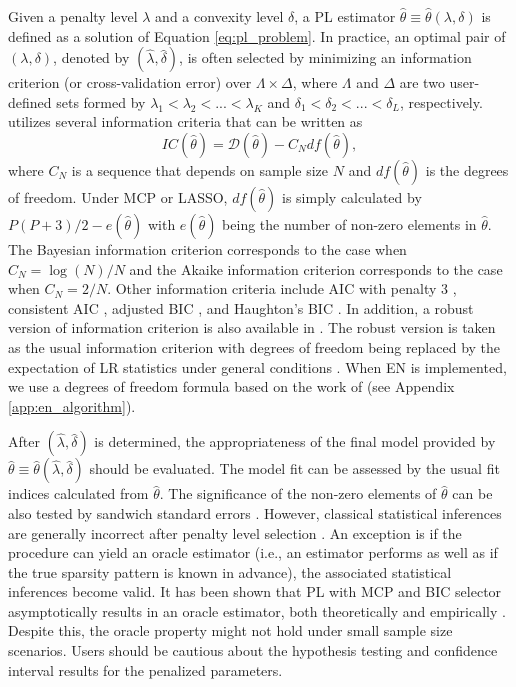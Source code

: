 \documentclass[nojss]{jss}
\begin{document}
Given a penalty level $\lambda$ and a convexity level $\delta$, a PL estimator $\hat{\theta} \equiv \hat{\theta}(\lambda, \delta)$ is defined as a solution of Equation \ref{eq:pl_problem}. In practice, an optimal pair of $(\lambda,\delta)$, denoted by $(\hat{\lambda},\hat{\delta})$, is often selected by minimizing an information criterion (or cross-validation error) over $\Lambda \times \Delta$, where $\Lambda$ and $\Delta$ are two user-defined sets formed by $\lambda_1 < \lambda_2 < ... < \lambda_K$ and $\delta_1 < \delta_2 <...<\delta_L$, respectively.  utilizes several information criteria that can be written as
%
\begin{equation} \label{eq:ic}
IC(\hat{\theta}) = \mathcal{D}(\hat{\theta}) - C_N df(\hat{\theta}),
\end{equation}
%
where $C_N$ is a sequence that depends on sample size $N$ and $df(\hat{\theta})$ is the degrees of freedom. Under MCP or LASSO, $df(\hat{\theta})$ is simply calculated by $P(P+3)/2-e(\hat{\theta})$ with $e(\hat{\theta})$ being the number of non-zero elements in $\hat{\theta}$. The Bayesian information criterion \citep[BIC;][]{Schwarz1978} corresponds to the case when $C_N=\log(N)/N$ and the Akaike information criterion \citep[AIC;][]{Akaike1974} corresponds to the case when $C_N=2/N$. Other information criteria include AIC with penalty 3 \citep[AIC3;][]{Sclove1987}, consistent AIC \citep[CAIC;][]{Bozdogan1987}, adjusted BIC \citep[ABIC;][]{Sclove1987}, and Haughton's BIC \citep[HBIC;][]{haughton1988}. In addition, a robust version of information criterion is also available in . The robust version is taken as the usual information criterion with degrees of freedom being replaced by the expectation of LR statistics under general conditions \citep[e.g.,][see Appendix \ref{app:technical} for technical details]{Yuan2007}. When EN is implemented, we use a degrees of freedom formula based on the work of \cite{tibshirani2012} (see Appendix \ref{app:en_algorithm}).

After $(\hat{\lambda},\hat{\delta})$ is determined, the appropriateness of the final model provided by $\hat{\theta} \equiv \hat{\theta}(\hat{\lambda},\hat{\delta})$ should be evaluated. The model fit can be assessed by the usual fit indices calculated from $\hat{\theta}$. The significance of the non-zero elements of $\hat{\theta}$ can be also tested by sandwich standard errors \citep[e.g.,][see Appendix \ref{app:technical}]{Browne1984, Yuan2006, Yuan2008}. However, classical statistical inferences are generally incorrect after penalty level selection \citep[or any model selection process; see][]{leeb2006, Potscher1991}. An exception is if the procedure can yield an oracle estimator (i.e., an estimator performs as well as if the true sparsity pattern is known in advance), the associated statistical inferences become valid. It has been shown that PL with MCP and BIC selector asymptotically results in an oracle estimator, both theoretically and empirically \citep{Huang}. Despite this, the oracle property might not hold under small sample size scenarios. Users should be cautious about the hypothesis testing and confidence interval results for the penalized parameters. 
\end{document}
